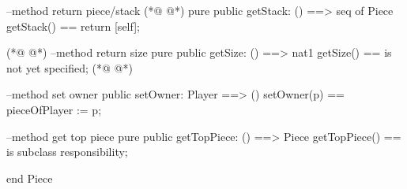 \begin{vdmpp}[breaklines=true]
  --method return piece/stack
(*@
\label{getOwner:74}
@*)
  pure public getStack: () ==> seq of Piece
  getStack() == return [self];
  
(*@
\label{setOwner:77}
@*)
  --method return size
  pure public getSize: () ==> nat1
  getSize() == is not yet specified;
(*@
\label{getTopPiece:80}
@*)

  --method set owner  
  public setOwner: Player ==> ()
  setOwner(p) == pieceOfPlayer := p;
  
  --method get top piece
  pure public getTopPiece: () ==> Piece
  getTopPiece() == is subclass responsibility;
 
end Piece
\end{vdmpp}
